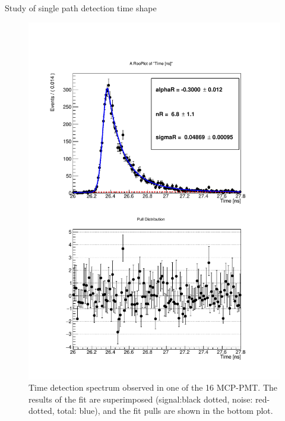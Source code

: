 \documentclass[a4paper,11pt]{article}
\begin{document}
\begin{subsection}{Study of single path detection time shape}
\begin{figure}
\begin{center}
\includegraphics[scale=0.5]{plots/Sig_shape_ch5}
\caption{Time detection spectrum observed in one of the 16 MCP-PMT. The results of the fit are superimposed (signal:black dotted, noise: red-dotted, total: blue), and the fit pulls are shown in the bottom plot.}
\label{fig:sig_shape_ch5}
\end{center}
\end{figure}


\end{subsection}
\end{document}
